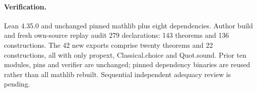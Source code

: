 \documentclass{article}
\begin{document}
\paragraph{Verification.} Lean 4.35.0 and unchanged pinned mathlib plus eight dependencies. Author build and fresh own-source replay audit 279 declarations: 143 theorems and 136 constructions. The 42 new exports comprise twenty theorems and 22 constructions, all with only propext, Classical.choice and Quot.sound. Prior ten modules, pins and verifier are unchanged; pinned dependency binaries are reused rather than all mathlib rebuilt. Sequential independent adequacy review is pending.
\end{document}
